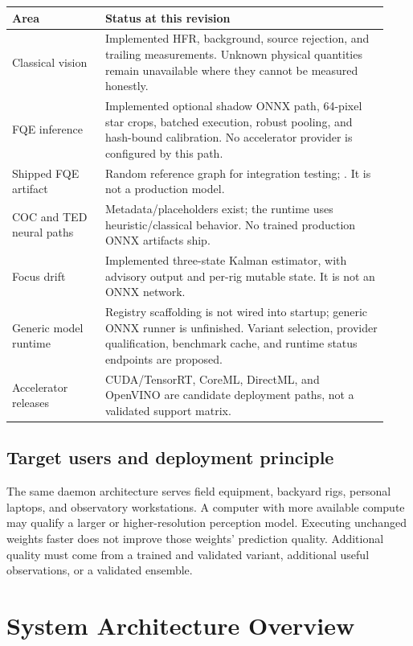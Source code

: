 \documentclass[11pt,a4paper]{article}
\newcommand{\code}[1]{\texttt{\detokenize{#1}}}
\begin{document}
\begin{longtable}{@{}L{0.23\linewidth}L{0.70\linewidth}@{}}
\toprule Area & Status at this revision\\\midrule\endhead
Classical vision & Implemented HFR, background, source rejection, and trailing
measurements. Unknown physical quantities remain unavailable where they cannot
be measured honestly.\\
FQE inference & Implemented optional shadow ONNX path, 64-pixel star crops,
batched execution, robust pooling, and hash-bound calibration. No accelerator
provider is configured by this path.\\
Shipped FQE artifact & Random reference graph for integration testing;
\code{runtime_eligible=false}. It is not a production model.\\
COC and TED neural paths & Metadata/placeholders exist; the runtime uses
heuristic/classical behavior. No trained production ONNX artifacts ship.\\
Focus drift & Implemented three-state Kalman estimator, with advisory output
and per-rig mutable state. It is not an ONNX network.\\
Generic model runtime & Registry scaffolding is not wired into startup;
generic ONNX runner is unfinished. Variant selection, provider qualification,
benchmark cache, and runtime status endpoints are proposed.\\
Accelerator releases & CUDA/TensorRT, CoreML, DirectML, and OpenVINO are
candidate deployment paths, not a validated support matrix.\\
\bottomrule
\end{longtable}

\subsection{Target users and deployment principle}
The same daemon architecture serves field equipment, backyard rigs, personal
laptops, and observatory workstations. A computer with more available compute
may qualify a larger or higher-resolution perception model. Executing unchanged
weights faster does not improve those weights' prediction quality. Additional
quality must come from a trained and validated variant, additional useful
observations, or a validated ensemble.

\section{System Architecture Overview}
\label{sec:architecture}
\end{document}
